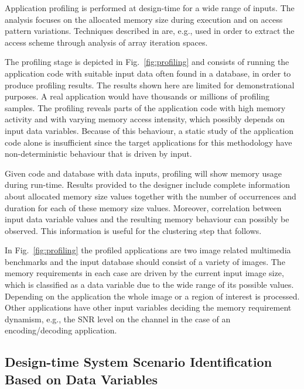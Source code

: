 \documentclass[smallcondensed]{svjour3}
\begin{document}
Application profiling is performed at design-time for a wide range of inputs. 
The analysis focuses on the allocated memory size during execution and on access pattern variations. 
Techniques described in \cite{Ang13b} are, e.g., used in order to extract the access scheme through analysis of array iteration spaces.  

The profiling stage is depicted in Fig.~\ref{fig:profiling} and consists of running the application code with suitable input data often found in a database, in order to produce profiling results. 
The results shown here are limited for demonstrational purposes. 
A real application would have thousands or millions of profiling samples. 
The profiling reveals parts of the application code with high memory activity and with varying memory access intensity, which possibly depends on input data variables. 
Because of this behaviour, a static study of the application code alone is insufficient since the target applications for this methodology have non-deterministic behaviour that is driven by input.

Given code and database with data inputs, profiling will show memory usage during run-time.
Results provided to the designer include complete information about allocated memory size values together with the number of occurrences and duration for each of these memory size values. 
Moreover, correlation between input data variable values and the resulting memory behaviour can possibly be observed. This information is useful for the clustering step that follows. 

In Fig.~\ref{fig:profiling} the profiled applications are two image related multimedia benchmarks and the input database should consist of a variety of images. 
The memory requirements in each case are driven by the current input image size, which is classified as a data variable due to the wide range of its possible values. 
Depending on the application the whole image or a region of interest is processed. 
Other applications have other input variables deciding the memory requirement dynamism, e.g., the SNR level on the channel in the case of an encoding/decoding application.

\subsection{Design-time System Scenario Identification Based on Data Variables}
\end{document}
